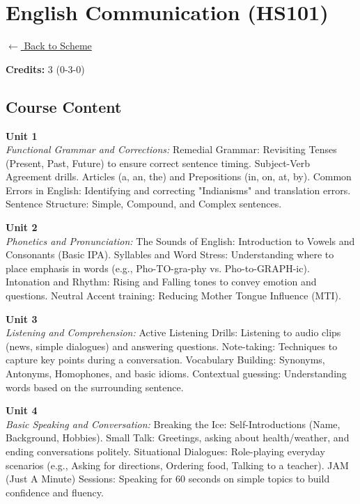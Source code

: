 \section*{English Communication (HS101)}
\label{course:HS101}

\noindent \small{\hyperref[main:scheme]{$\leftarrow$ Back to Scheme}} \vspace{0.5cm}

\noindent \textbf{Credits:} 3 (0-3-0)

\subsection*{Course Content}
\noindent\textbf{Unit 1} \\
\textit{Functional Grammar and Corrections:} Remedial Grammar: Revisiting Tenses (Present, Past, Future) to ensure correct sentence timing. Subject-Verb Agreement drills. Articles (a, an, the) and Prepositions (in, on, at, by). Common Errors in English: Identifying and correcting "Indianisms" and translation errors. Sentence Structure: Simple, Compound, and Complex sentences.

\vspace{0.3cm}

\noindent\textbf{Unit 2} \\
\textit{Phonetics and Pronunciation:} The Sounds of English: Introduction to Vowels and Consonants (Basic IPA). Syllables and Word Stress: Understanding where to place emphasis in words (e.g., Pho-TO-gra-phy vs. Pho-to-GRAPH-ic). Intonation and Rhythm: Rising and Falling tones to convey emotion and questions. Neutral Accent training: Reducing Mother Tongue Influence (MTI).

\vspace{0.3cm}

\noindent\textbf{Unit 3} \\
\textit{Listening and Comprehension:} Active Listening Drills: Listening to audio clips (news, simple dialogues) and answering questions. Note-taking: Techniques to capture key points during a conversation. Vocabulary Building: Synonyms, Antonyms, Homophones, and basic idioms. Contextual guessing: Understanding words based on the surrounding sentence.

\vspace{0.3cm}

\noindent\textbf{Unit 4} \\
\textit{Basic Speaking and Conversation:} Breaking the Ice: Self-Introductions (Name, Background, Hobbies). Small Talk: Greetings, asking about health/weather, and ending conversations politely. Situational Dialogues: Role-playing everyday scenarios (e.g., Asking for directions, Ordering food, Talking to a teacher). JAM (Just A Minute) Sessions: Speaking for 60 seconds on simple topics to build confidence and fluency.

